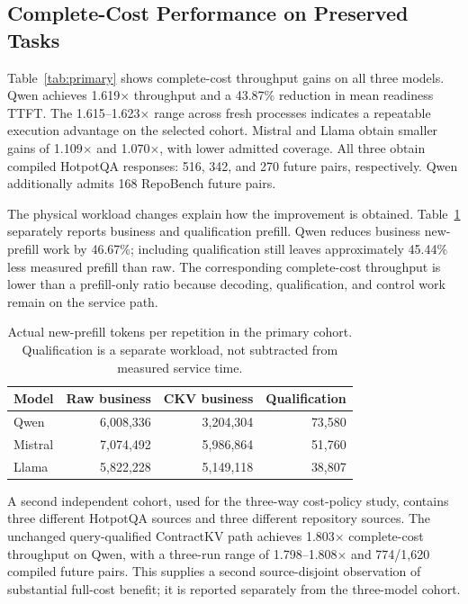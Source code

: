 \subsection{Complete-Cost Performance on Preserved Tasks}
\label{sec:mainresults}
Table~\ref{tab:primary} shows complete-cost throughput gains on all three models. Qwen achieves 1.619$\times$ throughput and a 43.87\% reduction in mean readiness TTFT. The 1.615--1.623$\times$ range across fresh processes indicates a repeatable execution advantage on the selected cohort. Mistral and Llama obtain smaller gains of 1.109$\times$ and 1.070$\times$, with lower admitted coverage. All three obtain compiled HotpotQA responses: 516, 342, and 270 future pairs, respectively. Qwen additionally admits 168 RepoBench future pairs.

The physical workload changes explain how the improvement is obtained. Table~\ref{tab:prefill} separately reports business and qualification prefill. Qwen reduces business new-prefill work by 46.67\%; including qualification still leaves approximately 45.44\% less measured prefill than raw. The corresponding complete-cost throughput is lower than a prefill-only ratio because decoding, qualification, and control work remain on the service path.

\begin{table}[t]
\centering\small
\caption{Actual new-prefill tokens per repetition in the primary cohort. Qualification is a separate workload, not subtracted from measured service time.}
\label{tab:prefill}
\begin{tabular}{@{}lrrr@{}}
\toprule
Model & Raw business & CKV business & Qualification\\
\midrule
Qwen & 6,008,336 & 3,204,304 & 73,580\\
Mistral & 7,074,492 & 5,986,864 & 51,760\\
Llama & 5,822,228 & 5,149,118 & 38,807\\
\bottomrule
\end{tabular}
\end{table}

A second independent cohort, used for the three-way cost-policy study, contains three different HotpotQA sources and three different repository sources. The unchanged query-qualified ContractKV path achieves 1.803$\times$ complete-cost throughput on Qwen, with a three-run range of 1.798--1.808$\times$ and 774/1,620 compiled future pairs. This supplies a second source-disjoint observation of substantial full-cost benefit; it is reported separately from the three-model cohort.

